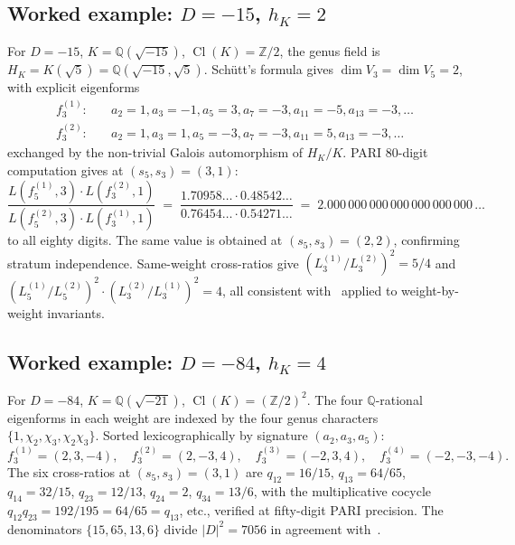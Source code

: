 \documentclass[11pt]{amsart}
\theoremstyle{definition}
\theoremstyle{remark}
\DeclareMathOperator{\Cl}{Cl}
\newcommand{\Q}{\mathbb{Q}}
\newcommand{\Z}{\mathbb{Z}}
\newcommand{\HK}{H_K}
\begin{document}
\subsection{Worked example: $D = -15$, $h_K = 2$}
\label{ss:example-D15}
For $D = -15$, $K = \Q(\sqrt{-15})$, $\Cl(K) = \Z/2$, the genus field
is $\HK = K(\sqrt{5}) = \Q(\sqrt{-15}, \sqrt{5})$. Sch\"utt's formula
gives $\dim V_3 = \dim V_5 = 2$, with explicit eigenforms
\begin{align*}
f_3^{(1)} : \quad &a_2 = 1, a_3 = -1, a_5 = 3, a_7 = -3, a_{11} = -5,
a_{13} = -3, \dots \\
f_3^{(2)} : \quad &a_2 = 1, a_3 = 1, a_5 = -3, a_7 = -3, a_{11} = 5,
a_{13} = -3, \dots
\end{align*}
exchanged by the non-trivial Galois automorphism of $\HK/K$. PARI
80-digit computation gives at $(s_5, s_3) = (3, 1)$:
\[
\frac{L(f_5^{(1)}, 3) \cdot L(f_3^{(2)}, 1)}
{L(f_5^{(2)}, 3) \cdot L(f_3^{(1)}, 1)}
\; = \;
\frac{1.70958\ldots \cdot 0.48542\ldots}
{0.76454\ldots \cdot 0.54271\ldots}
\; = \; 2.000\,000\,000\,000\,000\,000\,000\,\ldots
\]
to all eighty digits. The same value is obtained at $(s_5, s_3) = (2,
2)$, confirming stratum independence. Same-weight cross-ratios give
$(L_3^{(1)}/L_3^{(2)})^2 = 5/4$ and $(L_5^{(1)}/L_5^{(2)})^2 \cdot
(L_3^{(2)}/L_3^{(1)})^2 = 4$, all consistent with~
applied to weight-by-weight invariants.

\subsection{Worked example: $D = -84$, $h_K = 4$}
\label{ss:example-D84}
For $D = -84$, $K = \Q(\sqrt{-21})$, $\Cl(K) = (\Z/2)^2$. The
four $\Q$-rational eigenforms in each weight are indexed by the four
genus characters $\{1, \chi_2, \chi_3, \chi_2\chi_3\}$. Sorted
lexicographically by signature $(a_2, a_3, a_5)$:
\[
f_3^{(1)} = (2, 3, -4), \quad
f_3^{(2)} = (2, -3, 4), \quad
f_3^{(3)} = (-2, 3, 4), \quad
f_3^{(4)} = (-2, -3, -4).
\]
The six cross-ratios at $(s_5, s_3) = (3,1)$ are
$q_{12} = 16/15$, $q_{13} = 64/65$, $q_{14} = 32/15$,
$q_{23} = 12/13$, $q_{24} = 2$, $q_{34} = 13/6$,
with the multiplicative cocycle $q_{12} q_{23} = 192/195 = 64/65 =
q_{13}$, etc., verified at fifty-digit PARI precision. The
denominators $\{15, 65, 13, 6\}$ divide $|D|^2 = 7056$ in agreement
with~.
\end{document}
